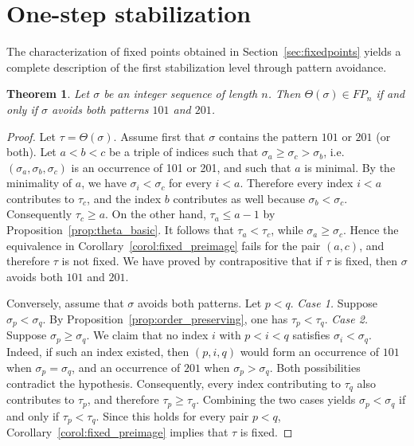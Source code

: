 \documentclass[11pt]{article}
\newtheorem{thm}{Theorem}[section]
\theoremstyle{remark}
\theoremstyle{definition}
\begin{document}
\section{One-step stabilization}\label{sec:stabilization}

The characterization of fixed points obtained in Section~\ref{sec:fixedpoints} yields a complete description of the first stabilization level through pattern avoidance.

\begin{thm}\label{thm:avoid_101_201}
Let $\sigma$ be an integer sequence of length $n$. Then $\Theta(\sigma) \in FP_n$ if and only if $\sigma$ avoids both patterns $101$ and $201$.
\end{thm}

\begin{proof}
Let $\tau=\Theta(\sigma)$. Assume first that $\sigma$ contains the pattern $101$ or $201$ (or both). Let $a < b < c$ be a triple of indices such that $\sigma_a \geq \sigma_c > \sigma_b$, i.e. $(\sigma_a, \sigma_b, \sigma_c)$ is an occurrence of 101 or 201, and such that $a$ is minimal. By the minimality of $a$, we have $\sigma_i < \sigma_c$ for every $i < a$. Therefore every index $i<a$ contributes to $\tau_c$, and the index $b$ contributes as well because $\sigma_b<\sigma_c$. Consequently $\tau_c\geq a$. On the other hand, $\tau_a\leq a-1$ by Proposition~\ref{prop:theta_basic}. It follows that $\tau_a<\tau_c$, while $\sigma_a\geq\sigma_c$. Hence the equivalence in Corollary~\ref{corol:fixed_preimage} fails for the pair $(a,c)$, and therefore $\tau$ is not fixed. We have proved by contrapositive that if $\tau$ is fixed, then $\sigma$ avoids both $101$ and $201$.

Conversely, assume that $\sigma$ avoids both patterns. Let $p<q$.
\newline
\textit{Case 1.} Suppose $\sigma_p<\sigma_q$. By Proposition~\ref{prop:order_preserving}, one has $\tau_p<\tau_q$.
\newline
\textit{Case 2.} Suppose $\sigma_p\geq\sigma_q$. We claim that no index $i$ with $p<i<q$ satisfies $\sigma_i<\sigma_q$. Indeed, if such an index existed, then $(p,i,q)$ would form an occurrence of $101$ when $\sigma_p=\sigma_q$, and an occurrence of $201$ when $\sigma_p>\sigma_q$. Both possibilities contradict the hypothesis. Consequently, every index contributing to $\tau_q$ also contributes to $\tau_p$, and therefore $\tau_p\geq\tau_q$. Combining the two cases yields $\sigma_p<\sigma_q$ if and only if $\tau_p<\tau_q$. Since this holds for every pair $p<q$, Corollary~\ref{corol:fixed_preimage} implies that $\tau$ is fixed.
\end{proof}
\end{document}
